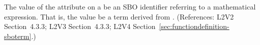 The value of the  attribute on a \FunctionDefinition {} be an
SBO identifier referring to a mathematical expression.  That is, the value
 be a term derived from \sbomathformula.  (References: L2V2 Section~4.3.3;
L2V3 Section~4.3.3; L2V4 Section~\ref{sec:functiondefinition-sboterm}.)
